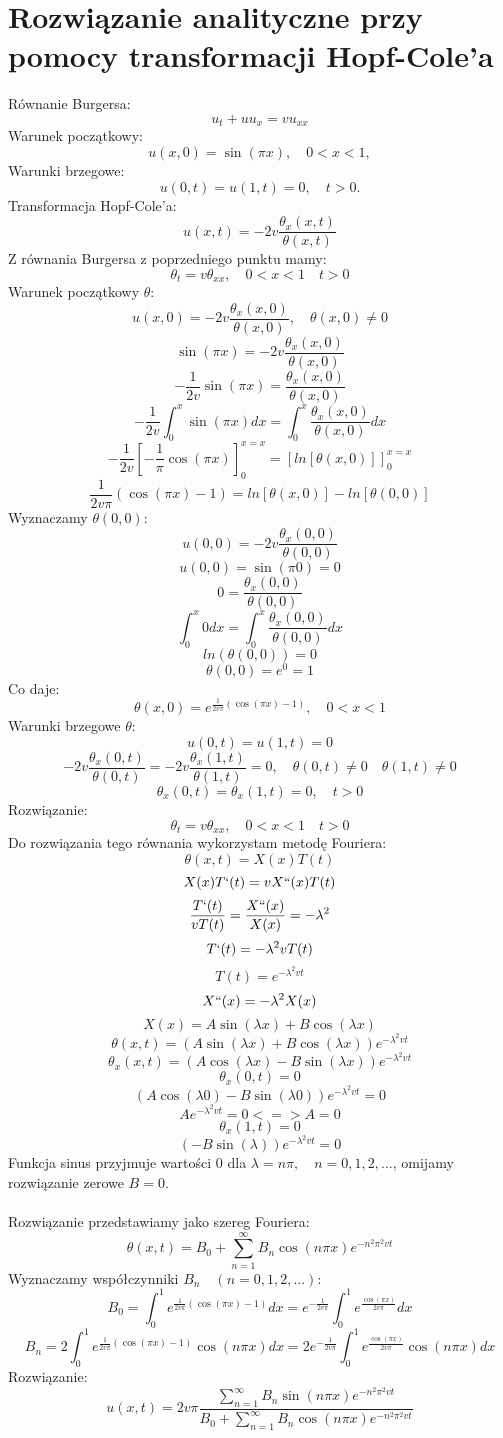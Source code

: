 \documentclass[a4paper,12pt]{article}
\begin{document}
\section{Rozwiązanie analityczne przy pomocy transformacji Hopf-Cole'a}
Równanie Burgersa: $$u_t +uu_x=vu_{xx}$$
Warunek początkowy: $$u(x,0)=\sin (\pi x), \quad 0<x<1,$$ Warunki brzegowe: $$u(0,t)=u(1,t)=0, \quad t>0. $$ Transformacja Hopf-Cole'a: $$u(x,t)=-2v\frac{\theta _x (x,t)}{\theta (x,t)}$$ Z równania Burgersa z poprzedniego punktu mamy: $$ \theta _t = v \theta _{xx}, \quad 0<x<1 \quad t>0$$
Warunek początkowy $\theta :$
$$u(x,0)=-2v\frac{\theta _x (x,0)}{\theta (x,0)}, \quad \theta (x,0) \neq 0$$
$$\sin (\pi x) = -2v\frac{\theta _x (x,0)}{\theta (x,0)}$$
$$-\frac{1}{2v}\sin (\pi x)=\frac{\theta _x (x,0)}{\theta (x,0)}$$
$$-\frac{1}{2v} \int^x_0 \sin (\pi x)dx = \int^x_0 \frac{\theta _x (x,0)}{\theta (x,0)}dx $$
$$-\frac{1}{2v} [-\frac{1}{\pi}\cos (\pi x)]^{x=x}_0=[ln[\theta (x,0)]]^{x=x}_0$$
$$\frac{1}{2v\pi}(\cos (\pi x)-1)=ln[\theta (x,0)]-ln[\theta (0,0)]$$
Wyznaczamy $\theta (0,0)$:
$$u(0,0)=-2v\frac{\theta _x (0,0)}{\theta (0,0)}$$
$$u(0,0)=\sin (\pi 0)=0$$
$$0=\frac{\theta _x (0,0)}{\theta (0,0)}$$
$$\int^x_0 0 dx = \int^x_0 \frac{\theta _x (0,0)}{\theta (0,0)} dx$$
$$ln(\theta(0,0))=0$$
$$\theta (0,0) = e^0=1$$
Co daje:
$$\theta (x,0)= e^{\frac{1}{2v\pi}(\cos (\pi x)-1)}, \quad 0<x<1$$
Warunki brzegowe $\theta:$
$$u(0,t)=u(1,t)=0$$
$$-2v\frac{\theta _x (0,t)}{\theta (0,t)}=-2v\frac{\theta _x (1,t)}{\theta (1,t)}=0,\quad \theta (0,t)\neq 0 \quad \theta (1,t) \neq 0$$
$$\theta _x (0,t) = \theta _x (1,t) =0, \quad t>0$$
Rozwiązanie: $$\theta _t = v \theta _{xx}, \quad 0<x<1 \quad t>0$$
Do rozwiązania tego równania wykorzystam metodę Fouriera:
$$\theta (x,t)=X(x)T(t)$$
$$X(x)T`(t)=vX``(x)T(t)$$
$$\frac{T`(t)}{vT(t)}=\frac{X``(x)}{X(x)}=-\lambda ^2$$
$$T`(t)=-\lambda ^2 vT(t)$$
$$T(t)=e^{-\lambda ^2 vt}$$
$$X``(x)=-\lambda ^2X(x)$$
$$X(x)=A\sin(\lambda x)+B\cos(\lambda x)$$
$$\theta (x,t) = (A\sin(\lambda x)+B\cos(\lambda x))e^{-\lambda ^2 vt}$$
$$\theta _x (x,t)=(A\cos(\lambda x)-B\sin(\lambda x))e^{-\lambda ^2 vt}$$
$$\theta _x (0,t)=0$$
$$(A\cos(\lambda 0)-B\sin(\lambda 0))e^{-\lambda ^2 vt}=0$$
$$Ae^{-\lambda ^2 vt}=0 <=> A =0$$
$$\theta _x (1,t)=0$$
$$(-B\sin(\lambda))e^{-\lambda ^2 vt}=0$$
Funkcja sinus przyjmuje wartości 0 dla $\lambda=n\pi,\quad n=0,1,2,...$, omijamy rozwiązanie zerowe $B=0$.
\\ \\
Rozwiązanie przedstawiamy jako szereg Fouriera: 
$$\theta  (x,t) =B_0+ \sum_{n=1}^\infty B_n \cos (n\pi x) e^{-n^2 \pi ^2 vt}$$
Wyznaczamy współczynniki $B_n\quad (n=0,1,2,...)$:
$$B_0 = \int_0^1 e^{\frac{1}{2v\pi}(\cos (\pi x)-1)}dx 
=e^{-\frac{1}{2v\pi}}\int_0^1 e^{\frac{\cos (\pi x)}{2v\pi}}dx$$
$$B_n = 2\int_0^1 e^{\frac{1}{2v\pi}(\cos (\pi x)-1)}\cos (n \pi x)dx=2e^{-\frac{1}{2v\pi}}\int_0^1 e^{\frac{\cos (\pi x)}{2v\pi}}\cos (n \pi x)dx$$
Rozwiązanie:
$$u (x,t) = 2v\pi \frac{\sum_{n=1}^\infty B_n \sin (n\pi x) e^{-n^2 \pi ^2 vt}}{B_0+ \sum_{n=1}^\infty B_n \cos (n\pi x) e^{-n^2 \pi ^2 vt}}$$
\end{document}
